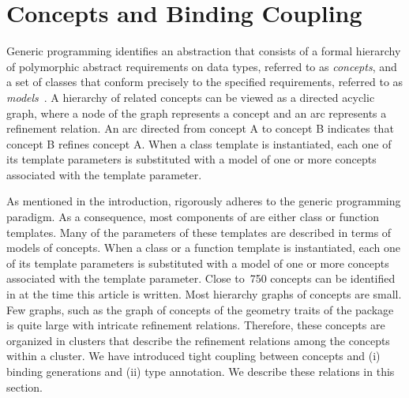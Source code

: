 \section{Concepts and Binding Coupling}
\label{sec:concepts}
Generic programming identifies an abstraction that consists of a formal hierarchy of polymorphic abstract requirements on data types, referred to as \emph{concepts}, and a set of classes that conform precisely to the specified requirements, referred to as \emph{models}~\cite{a-gps-99}. A hierarchy of related concepts can be viewed as a directed acyclic graph, where a node of the graph represents a concept and an arc represents a refinement relation. An arc directed from concept A to concept B indicates that concept B refines concept A. When a class template is instantiated, each one of its template parameters is substituted with a model of one or more concepts associated with the template parameter.

As mentioned in the introduction, \cgal{} rigorously adheres to the generic programming paradigm. As a consequence, most components of \cgal{} are either class or function templates. Many of the parameters of these templates are described in terms of models of concepts. When a class or a function template is instantiated, each one of its template parameters is substituted with a model of one or more concepts associated with the template parameter. Close to~750 concepts can be identified in \cgal{} at the time this article is written. Most hierarchy graphs of concepts are small. Few graphs, such as the graph of concepts of the geometry traits of the \iiDArrangementsPackage{} package is quite large with intricate refinement relations. Therefore, these concepts are organized in clusters that describe the refinement relations among the concepts within a cluster. We have introduced tight coupling between concepts and (i) binding generations and (ii) type annotation. We describe these relations in this section.


